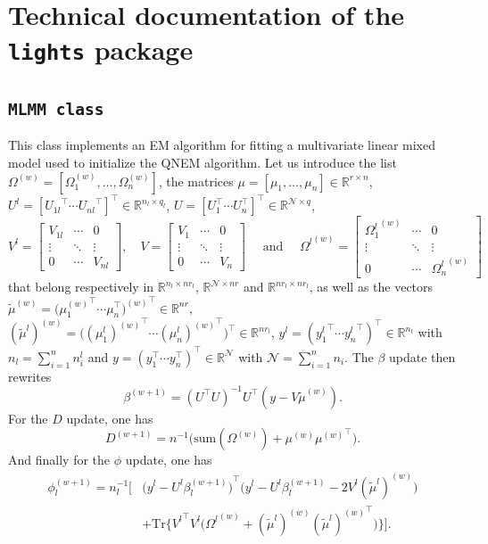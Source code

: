 \documentclass[11pt]{article}
\newcommand{\cN}{\mathcal N}
\newcommand{\R}{\mathds R}
\begin{document}
\section{Technical documentation of the \texttt{lights} package}
\label{sec:package}

\subsection{\texttt{MLMM class}}
\label{sec:MLMM class}

This class implements an EM algorithm for fitting a multivariate linear mixed model used to initialize the QNEM algorithm.
Let us introduce the list $\Omega^{(w)} = [\Omega_1^{(w)}, \ldots, \Omega_n^{(w)}]$, the matrices $\mu = [\mu_1, \ldots, \mu_n] \in \R^{r \times n}$, $U^l = [{U_{1l}}^\top \cdots {U_{nl}}^\top]^\top \in \R^{n_l \times q_l}$, $U = [U_1^\top \cdots U_n^\top]^\top \in \R^{\cN \times q}$,
\[ V^l = \begin{bmatrix}
    V_{1l} & \cdots & 0\\
    \vdots &  \ddots & \vdots \\
    0 & \cdots & V_{nl}
\end{bmatrix},
\quad
V = \begin{bmatrix}
  V_{1} & \cdots & 0\\
  \vdots &  \ddots & \vdots \\
  0 & \cdots & V_{n}
\end{bmatrix}
\quad \text{ and } \quad
{\Omega^l}^{(w)} = \begin{bmatrix}
    {\Omega_{1}^l}^{(w)} & \cdots & 0\\
    \vdots &  \ddots & \vdots \\
    0 & \cdots & {\Omega_{n}^l}^{(w)}
\end{bmatrix}\]
that belong respectively in $\R^{n_l \times nr_l}$, $\R^{\cN \times nr}$ and $\R^{nr_l \times nr_l}$, as well as the vectors $\tilde \mu^{(w)} = ({\mu_1^{(w)}}^\top \cdots {\mu_n^\top)^{(w)}}^\top \in \R^{nr}$, $(\tilde \mu^l)^{(w)} = \big({(\mu_1^l)^{(w)}}^\top \cdots {(\mu_n^l)^{(w)}}^\top \big)^\top \in \R^{nr_l}$, $y^l = ({y_1^l}^\top  \cdots {y_n^l}^\top)^\top \in \R^{n_l}$
with $n_l = \sum_{i=1}^{n} n_i^l$ and $y = (y_1^\top \cdots y_n^\top)^\top \in \R^\cN$ with $\cN = \sum_{i=1}^{n} n_i$.
The $\beta$ update then rewrites
\[\beta^{(w+1)} = ({U}^\top U)^{-1}{U}^\top(y-V \tilde \mu^{(w)}).\]
For the $D$ update, one has
\[D^{(w+1)} = n^{-1} \big( \text{sum}(\Omega^{(w)}) + \mu^{(w)}{\mu^{(w)}}^\top\big).\]
And finally for the $\phi$ update, one has
\begin{align*}
\phi_l^{(w+1)} = n_l^{-1} \big[&(y^l - U^l{\beta_l^{(w+1)})}^\top \big(y^l - U^l\beta_l^{(w+1)} - 2 V^l (\tilde\mu^l)^{(w)}\big) \\
&+ \text{Tr}\big\{{V^l}^\top V^l \big({\Omega^l}^{(w)} + (\tilde\mu^l)^{(w)} {(\tilde\mu^l)^{(w)}}^\top\big)\big\} \big].
\end{align*}
\end{document}
